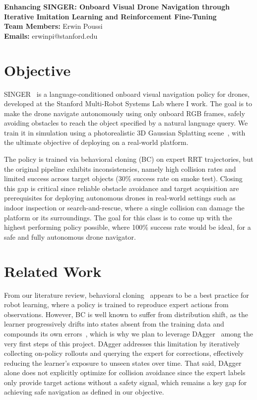 \documentclass{article}
\makeatletter
\renewcommand{\maketitle}{
  \begin{center}
    {\bf \large Enhancing SINGER: Onboard Visual Drone Navigation through Iterative Imitation Learning and Reinforcement Fine-Tuning}\\
    \vspace{0.1cm}
    {\bf Team Members:} Erwin Poussi\\
    \vspace{0.1cm}
    {\bf Emails:} erwinpi@stanford.edu\\
    \vspace{0.2cm}
  \end{center}
}
\makeatother
\begin{document}
\maketitle

\section{Objective} %

SINGER~\citep{singer2025} is a language-conditioned onboard visual navigation policy for drones, developed at the Stanford Multi-Robot Systems Lab where I work. The goal is to make the drone navigate autonomously using only onboard RGB frames, safely avoiding obstacles to reach the object specified by a natural language query. We train it in simulation using a photorealistic 3D Gaussian Splatting scene~\citep{sousvide2024}, with the ultimate objective of deploying on a real-world platform.

The policy is trained via behavioral cloning (BC) on expert RRT trajectories, but the original pipeline exhibits inconsistencies, namely high collision rates and limited success across target objects (30\% success rate on smoke test). Closing this gap is critical since reliable obstacle avoidance and target acquisition are prerequisites for deploying autonomous drones in real-world settings such as indoor inspection or search-and-rescue, where a single collision can damage the platform or its surroundings. The goal for this class is to come up with the highest performing policy possible, where 100\% success rate would be ideal, for a safe and fully autonomous drone navigator.

\section{Related Work} %

From our literature review, behavioral cloning~\citep{pomerleau1988alvinn} appears to be a best practice for robot learning, where a policy is trained to reproduce expert actions from observations. However, BC is well known to suffer from distribution shift, as the learner progressively drifts into states absent from the training data and compounds its own errors~\citep{ross2011dagger}, which is why we plan to leverage DAgger~\citep{ross2011dagger} among the very first steps of this project. DAgger addresses this limitation by iteratively collecting on-policy rollouts and querying the expert for corrections, effectively reducing the learner's exposure to unseen states over time. That said, DAgger alone does not explicitly optimize for collision avoidance since the expert labels only provide target actions without a safety signal, which remains a key gap for achieving safe navigation as defined in our objective.
\end{document}
